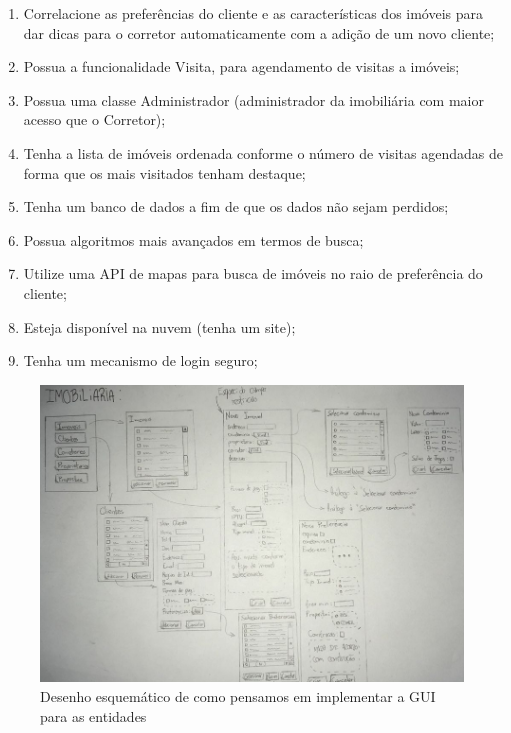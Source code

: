 \documentclass[a4paper,11pt,fleqn]{article}
\begin{document}
\begin{enumerate}
    \item Correlacione as preferências do cliente e as características dos imóveis para dar dicas para o corretor automaticamente com a adição de um novo cliente;
    \item Possua a funcionalidade Visita, para agendamento de visitas a imóveis;
    \item Possua uma classe Administrador (administrador da imobiliária com maior acesso que o Corretor);
    \item Tenha a lista de imóveis ordenada conforme o número de visitas agendadas de forma que os mais visitados tenham destaque;
    \item Tenha um banco de dados a fim de que os dados não sejam perdidos;
    \item Possua algoritmos mais avançados em termos de busca;
    \item Utilize uma API de mapas para busca de imóveis no raio de preferência do cliente;
    \item Esteja disponível na nuvem (tenha um site);
    \item Tenha um mecanismo de login seguro;
\end{enumerate}

\begin{figure}[h!]
  \begin{center}
    \includegraphics[scale=0.35]{imagens/interface-grafica.png}
  \end{center}
  \caption{Desenho esquemático de como pensamos em implementar a GUI para as entidades}
  \label{f:interface-grafica}
\end{figure}
\end{document}
